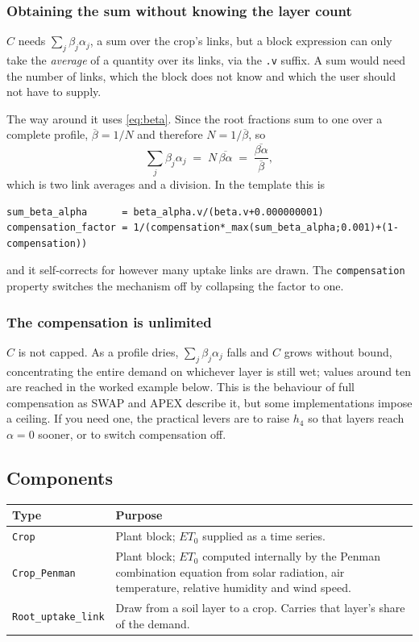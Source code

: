 \documentclass[11pt,a4paper]{article}
\newcommand{\code}[1]{\texttt{\small #1}}
\begin{document}
\subsubsection*{Obtaining the sum without knowing the layer count}

$C$ needs $\sum_j \beta_j \alpha_j$, a sum over the crop's links, but a block
expression can only take the \emph{average} of a quantity over its links, via
the \code{.v} suffix. A sum would need the number of links, which the block does
not know and which the user should not have to supply.

The way around it uses \eqref{eq:beta}. Since the root fractions sum to one over
a complete profile, $\overline{\beta} = 1/N$ and therefore $N =
1/\overline{\beta}$, so
\begin{equation}
\sum_j \beta_j \alpha_j
  \;=\; N \, \overline{\beta\alpha}
  \;=\; \frac{\overline{\beta\alpha}}{\overline{\beta}} ,
\end{equation}
which is two link averages and a division. In the template this is
\begin{lstlisting}[style=plain]
sum_beta_alpha      = beta_alpha.v/(beta.v+0.000000001)
compensation_factor = 1/(compensation*_max(sum_beta_alpha;0.001)+(1-compensation))
\end{lstlisting}
and it self-corrects for however many uptake links are drawn. The
\code{compensation} property switches the mechanism off by collapsing the factor
to one.

\subsubsection*{The compensation is unlimited}

$C$ is not capped. As a profile dries, $\sum_j \beta_j \alpha_j$ falls and $C$
grows without bound, concentrating the entire demand on whichever layer is still
wet; values around ten are reached in the worked example below. This is the
behaviour of full compensation as SWAP and APEX describe it, but some
implementations impose a ceiling. If you need one, the practical levers are to
raise $h_4$ so that layers reach $\alpha = 0$ sooner, or to switch compensation
off.

\subsection{Components}

\begin{longtable}{@{}p{4.2cm}p{10.3cm}@{}}
\toprule
\textbf{Type} & \textbf{Purpose} \\
\midrule
\endhead
\code{Crop} & Plant block; $ET_0$ supplied as a time series. \\
\code{Crop\_Penman} & Plant block; $ET_0$ computed internally by the Penman
  combination equation from solar radiation, air temperature, relative humidity
  and wind speed. \\
\code{Root\_uptake\_link} & Draw from a soil layer to a crop. Carries that
  layer's share of the demand. \\
\bottomrule
\end{longtable}
\end{document}
